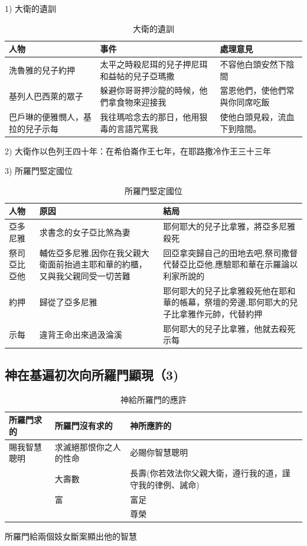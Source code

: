 \documentclass{ctexart}
\begin{document}
\begin{description}  
\item   1) 大衛的遺訓 
\begin{table}[!hbp]
\centering
\begin{tabular}{|p{4cm}|p{5cm}|p{5cm}|}
\hline
\hline
  人物   & 事件 &處理意見 \\\hline\hline
洗魯雅的兒子約押    & 太平之時殺尼珥的兒子押尼珥和益帖的兒子亞瑪撒 & 不容他白頭安然下陰間 \\\hline
基列人巴西萊的眾子     & 躲避你哥哥押沙龍的時候，他們拿食物來迎接我&當恩他們，使他們常與你同席吃飯 \\\hline
巴戶琳的便雅憫人，基拉的兒子示每    & 我往瑪哈念去的那日，他用狠毒的言語咒罵我&使他白頭見殺，流血下到陰間。  \\\hline
\end{tabular}
\caption{大衛的遺訓}
\end{table}
\item   2) 大衛作以色列王四十年：在希伯崙作王七年，在耶路撒冷作王三十三年 
\item   3) 所羅門堅定國位 
\begin{table}[!hbp]
\centering
\begin{tabular}{|p{1.5cm}|p{5cm}|p{8.5cm}|}
\hline
\hline
  人物   &原因 & 結局  \\\hline\hline
亞多尼雅 & 求書念的女子亞比煞為妻 & 耶何耶大的兒子比拿雅，將亞多尼雅殺死 \\\hline
祭司亞比亞他     & 輔佐亞多尼雅,因你在我父親大衛面前抬過主耶和華的約櫃，又與我父親同受一切苦難&回亞拿突歸自己的田地去吧,祭司撒督代替亞比亞他,應驗耶和華在示羅論以利家所說的\\\hline
約押    & 歸從了亞多尼雅&耶何耶大的兒子比拿雅殺死他在耶和華的帳幕，祭壇的旁邊,耶何耶大的兒子比拿雅作元帥，代替約押 \\\hline
示每&違背王命出來過汲淪溪&耶何耶大的兒子比拿雅，他就去殺死示每\\\hline
\end{tabular}
\caption{所羅門堅定國位}
\end{table}
\end{description}

\subsection{神在基遍初次向所羅門顯現（3)}
\begin{table}[!hbp]
\centering
\begin{tabular}{|p{3cm}|p{5cm}|p{5cm}|}
\hline
\hline
所羅門求的    &所羅門沒有求的         &神所應許的 \\\hline\hline
賜我智慧聰明  & 求滅絕那恨你之人的性命&必賜你智慧聰明 \\\hline
              & 大壽數                &長壽(你若效法你父親大衛，遵行我的道，謹守我的律例、誡命) \\\hline
              &  富                       &富足\\\hline
              &&尊榮\\\hline
\end{tabular}
\caption{神給所羅門的應許}
\end{table}
所羅門給兩個妓女斷案顯出他的智慧
\end{document}
